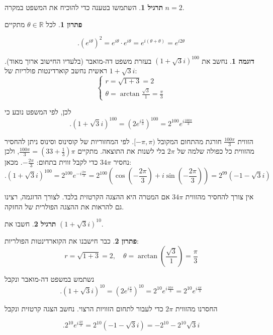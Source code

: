 \documentclass[12pt]{report}
\theoremstyle{plain}
\theoremstyle{definition}
\newtheorem{example}{דוגמה}[chapter]
\newtheorem{exercise}{תרגיל}[chapter]
\newtheorem*{solution}{פתרון}
\newcommand{\R}{\mathbb{R}}
\newcommand{\0}{\mathbf{0}}
\begin{document}
\begin{exercise}
השתמשו בטענה כדי להוכיח את המשפט במקרה $n=2$.
\end{exercise}

\begin{solution}
לכל
$\theta\in\R$
מתקיים

$$
.(e^{i\theta})^2=e^{i\theta}\cdot e^{i\theta}=e^{i(\theta+\theta)}=e^{i2\theta}
$$

\end{solution}

\begin{example}
נחשב את
$(1+\sqrt{3}i)^{100}$
בעזרת משפט דה-מואבר (בלעדיו החישוב ארוך מאוד). ראשית נחשב קוארדינטות פולריות של
$1+\sqrt{3}i$:
$$
\begin{cases}
r=\sqrt{1+3}=2\\
\theta=\arctan\frac{\sqrt{3}}{1}=\frac{\pi}{3}
\end{cases}
$$

לכן, לפי המשפט נובע כי
$$
.(1+\sqrt{3}i)^{100}=(2e^{i\frac{\pi}{3}})^{100}=2^{100}e^{i\frac{100\pi}{3}}
$$

הזווית $\frac{100\pi}{3}$ חורגת מהתחום המקובל $[-\pi,\pi)$.
לפי המחזוריות של קוסינוס וסינוס ניתן להחסיר מהזווית כל כפולה שלמה
של $2\pi$ בלי לשנות את התוצאה. מתקיים $\frac{100\pi}{3}=(33+\frac{1}{3})\pi$,
ולכן נחסיר $34\pi$ כדי לקבל זווית בתחום: $-\frac{2\pi}{3}$.
מכאן:
$$
.(1+\sqrt{3}i)^{100}=2^{100}e^{-i\frac{2\pi}{3}}=2^{100}(\cos(-\frac{2\pi}{3})+i\sin(-\frac{2\pi}{3}))=2^{99}(-1-\sqrt{3}i)
$$

אין צורך להחסיר מהזווית $34\pi$ אם המטרה היא ההצגה הקרטזית בלבד.
לצורך הדוגמה, רצינו גם להראות את ההצגה הפולרית של החזקה.
\end{example}

\begin{exercise}
חשבו את $(1+\sqrt{3}i)^{10}$.
\end{exercise}

\begin{solution}
כבר חישבנו את הקוארדינטות הפולריות:
$$
r=\sqrt{1+3}=2, \quad \theta=\arctan(\frac{\sqrt{3}}{1})=\frac{\pi}{3}
$$

נשתמש במשפט דה-מואבר ונקבל
$$
.(1+\sqrt{3}i)^{10}=(2e^{i\frac{\pi}{3}})^{10}=2^{10}e^{i\frac{10\pi}{3}}=2^{10}e^{i\frac{4\pi}{3}}
$$

החסרנו מהזווית
$2\pi$
כדי לעבור לתחום הזוויות הרצוי. נחשב הצגה קרטזית ונקבל

$$
.2^{10}e^{i\frac{4\pi}{3}}=2^{10}(-1-\sqrt{3}i)=-2^{10}-2^{10}\sqrt{3}i
$$
\end{solution}
\end{document}
